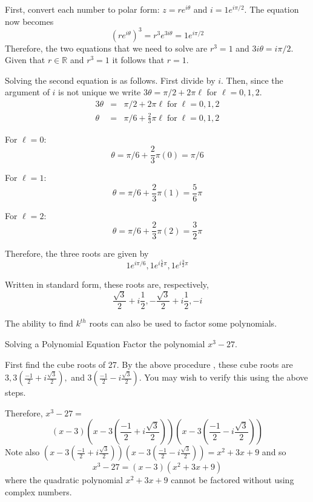 \begin{solution}
First, convert each number to polar form: $z = re^{i\theta}$ and $i = 1 e^{i \pi/2}$. The equation now becomes
\[
(re^{i\theta})^3 = r^3 e^{3i\theta} = 1 e^{i \pi/2}
\]
Therefore, the two equations that we need to solve are $r^3 = 1$ and $3i\theta = i \pi/2$. Given that $r \in \mathbb{R}$ and $r^3 = 1$ it follows that $r=1$. 

Solving the second equation is as follows. First divide by $i$. Then, since the argument of $i$ is not unique we write $3\theta = \pi/2 + 2\pi\ell$ for $\ell = 0,1,2$. 
\begin{eqnarray*}
3\theta &=& \pi/2 + 2\pi\ell \; \mbox{for} \; \ell = 0,1,2 \\
\theta &=& \pi/6 + \frac{2}{3} \pi\ell \; \mbox{for} \; \ell = 0,1,2 
\end{eqnarray*}

For $\ell = 0$:
\[
\theta = \pi/6 + \frac{2}{3} \pi (0) = \pi/6
\]

For $\ell = 1$:
\[
\theta = \pi/6 + \frac{2}{3} \pi(1) = \frac{5}{6} \pi
\]

For $\ell = 2$:
\[
\theta = \pi/6 + \frac{2}{3} \pi(2) = \frac{3}{2} \pi
\]

Therefore, the three roots are given by \[
1e^{i \pi/6}, 1e^{i \frac{5}{6}\pi}, 1e^{i \frac{3}{2}\pi}
\]

Written in standard form, these roots are, respectively,
\[
\frac{\sqrt{3}}{2} + i \frac{1}{2}, -\frac{\sqrt{3}}{2} + i \frac{1}{2}, -i
\]

\end{solution}

The ability to find $k^{th}$ roots can also be used to factor some
polynomials.

\begin{example}{Solving a Polynomial Equation}\label{exa:solvingpolynomial}
Factor the polynomial $x^{3}-27.$
\end{example}

\begin{solution}
First find the cube roots of 27. By the above procedure
, these cube roots
are $3,3\left( \displaystyle
\frac{-1}{2}+i\displaystyle\frac{\sqrt{3}}{2}\right) ,$ and $3\left( 
\displaystyle\frac{-1}{2}-i\displaystyle\frac{\sqrt{3}}{2}\right) $. You may wish to verify 
this using the above steps.

Therefore, $x^{3}-27 =$
\begin{equation*}
 \left( x-3\right) \left( x-3\left( \frac{-1}{2}+i\frac{\sqrt{3}}{2}\right)
\right) \left( x-3\left( \frac{-1}{2}-i\frac{\sqrt{3}}{2}\right) \right) 
\end{equation*}
Note also $\left( x-3\left( \frac{-1}{2}+i\frac{\sqrt{3}}{2}\right) \right)
\left( x-3\left( \frac{-1}{2}-i\frac{\sqrt{3}}{2}\right) \right)
=\allowbreak x^{2}+3x+9$ and so
\begin{equation*}
x^{3}-27=\left( x-3\right) \left( x^{2}+3x+9\right)
\end{equation*}
where the quadratic polynomial $x^{2}+3x+9$ cannot be factored without using
complex numbers.
\end{solution}

